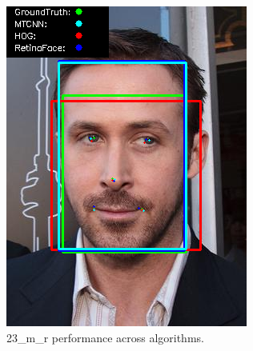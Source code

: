 \documentclass{l4proj}
\begin{document}
\begin{appendices}
\begin{figure}[h!]
\begin{minipage}{0.49\textwidth}
     \includegraphics[width=\textwidth]{images/appendix/23.png}
    \caption{23\_m\_r performance across algorithms.}
    \label{whoopi_result}
  \end{minipage}
\end{figure}


\end{appendices}
\end{document}

